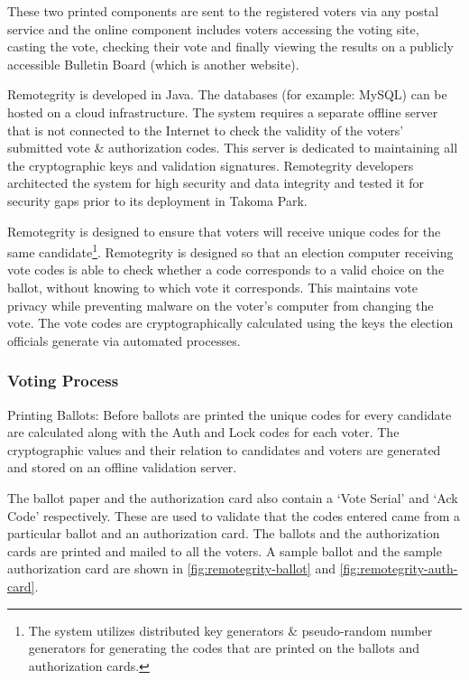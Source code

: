 These two printed components are sent to the registered voters via any
postal service and the online component includes voters accessing the
voting site, casting the vote, checking their vote and finally viewing
the results on a publicly accessible Bulletin Board (which is another
website).

Remotegrity is developed in Java. The databases (for example: MySQL)
can be hosted on a cloud infrastructure. The system requires a
separate offline server that is not connected to the Internet to check
the validity of the voters' submitted vote \& authorization
codes. This server is dedicated to maintaining all the cryptographic
keys and validation signatures. Remotegrity developers architected the
system for high security and data integrity and tested it for security
gaps prior to its deployment in Takoma Park.

Remotegrity is designed to ensure that voters will receive unique
codes for the same candidate\footnote{The system utilizes distributed
  key generators \& pseudo-random number generators for generating the
  codes that are printed on the ballots and authorization
  cards.}. Remotegrity is designed so that an election computer
receiving vote codes is able to check whether a code corresponds to a
valid choice on the ballot, without knowing to which vote it
corresponds. This maintains vote privacy while preventing malware on
the voter's computer from changing the vote. The vote codes are
cryptographically calculated using the keys the election officials
generate via automated processes.

\subsubsection{Voting Process}

Printing Ballots: Before ballots are printed the unique codes for
every candidate are calculated along with the Auth and Lock codes for
each voter. The cryptographic values and their relation to candidates
and voters are generated and stored on an offline validation server.

The ballot paper and the authorization card also contain a `Vote
Serial' and `Ack Code' respectively. These are used to validate that
the codes entered came from a particular ballot and an authorization
card. The ballots and the authorization cards are printed and mailed
to all the voters. A sample ballot and the sample authorization card
are shown in \autoref{fig:remotegrity-ballot} and
\autoref{fig:remotegrity-auth-card}.


